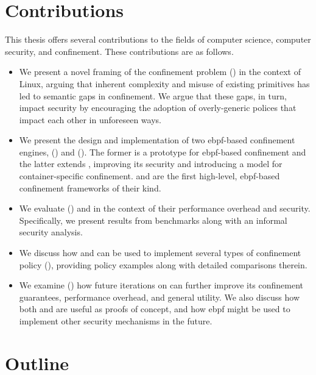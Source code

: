 \section{Contributions}%
\label{s:contributions}

This thesis offers several contributions to the fields of computer science, computer security, and
confinement. These contributions are as follows.
\begin{itemize}
  \item We present a novel framing of the confinement problem
  () in the context of Linux, arguing that inherent complexity
  and misuse of existing primitives has led to semantic gaps in confinement. We argue that
  these gaps, in turn, impact security by encouraging the adoption of overly-generic
  polices that impact each other in unforeseen ways.

  \item We present the design and implementation of two \gls{ebpf}-based confinement
  engines, \bpfbox{} () and \bpfcontain{} (). The former
  is a prototype for \gls{ebpf}-based confinement and the latter extends \bpfbox{},
  improving its security and introducing a model for container-specific confinement.
  \bpfbox{} and \bpfcontain{} are the first high-level, \gls{ebpf}-based confinement
  frameworks of their kind.

  \item We evaluate () \bpfbox{} and \bpfcontain{} in the context of
  their performance overhead and security. Specifically, we present results from
  benchmarks along with an informal security analysis.

  \item We discuss how \bpfbox{} and \bpfcontain{} can be used to implement several types
  of confinement policy (), providing policy examples along with
  detailed comparisons therein.

  \item We examine () how future iterations on \bpfcontain{} can
  further improve its confinement guarantees, performance overhead, and general utility.
  We also discuss how both \bpfbox{} and \bpfcontain{} are useful as proofs of concept,
  and how \gls{ebpf} might be used to implement other security mechanisms in the future.
\end{itemize}

\section{Outline}%
\label{s:outline}


